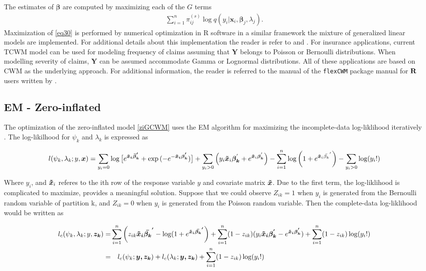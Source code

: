 \documentclass[11pt,letterpaper]{article}
\numberwithin{equation}{section}
\numberwithin{equation}{section}
\numberwithin{equation}{section}
\begin{document}
The estimates of $\bm\beta$ are computed by maximizing each of the $G$ terms
\begin{align}
\sum_{i=1}^{n}\pi^{(s)}_{ij} \log{q}(y_i|\bm x_i,\bm \beta_j,\lambda_j).
\label{eq30}
\end{align}
Maximization of \eqref{eq30} is performed by numerical optimization in R software in a similar framework the mixture of generalized linear models are implemented. For additional details about this implementation the reader is refer to \cite{Wedel+DeSabro:1995} and \cite{Wedel:2002}.
For insurance applications, current TCWM model can be used for modeling frequency of claims assuming that $\bm{Y}$ belongs to Poisson or Bernoulli distributions. When modelling severity of claims, $\bm{Y}$ can be assumed accommodate Gamma or Lognormal distributions. All of these applications are based on CWM as the underlying approach. For additional information, the reader is referred to the manual of the {\tt flexCWM} package manual for ${\bf R}$ users written by \cite{Ingrassia+Punzo+Vittadini+Minotti:2015}.%
\subsection{EM - Zero-inflated}
The optimization of the zero-inflated model \eqref{ziGCWM} uses the EM algorithm for maximizing the incomplete-data log-liklihood iteratively \citep{Lambert}. The log-likilhood for $\psi_k$ and $\lambda_k$ is expressed as 

\begin{align*}
l(\psi_k,\lambda_k; y, \bm{x}) = \sum_{y_i = 0} \log \big[ e^{ \bm{ \bm{\tilde{x}}_i \bar{\beta}_k^{'} } } + \exp{( - e^ { -\bm{ \bm{\tilde{x}}_i \beta_k^{'} }})} \big] + \sum_{y_i > 0 } \left( y_i \bm{\tilde{x}}_i \bm{\beta_k}^{'} + e^{ \bm{\tilde{x}}_i \bm{\beta_k}^{'} } \right) - \sum_{i=1}^n  \log \left(1 + e^ {\bm{\tilde{x}}_i \bar{\beta_k}^{'} } \right) - \sum_{y_i > 0} \log(y_i ! )
\end{align*}

Where $y_i$, and $\bm{\tilde{x}}_i$ referes to the ith row of the response variable $y$ and covariate matrix $\bm{\tilde{x}}$. Due to the first term, the log-liklihood is complicated to maximize, \cite{Lambert} provides a meaningful solution. Suppose that we could observe ${Z_{ik}} = 1$ when $y_i$ is generated from the Bernoulli random variable of partition k, and $Z_{ik} = 0$ when $y_i$ is generated from the Poisson random variable. Then the complete-data log-liklihood would be written as

\begin{align}
l_c(\psi_k,\lambda_k;y,\bm{z_k }) = & \sum_{i=1}^n \left( z_{ik}\bm{\bm{\tilde{x}}_i \bar{\beta_k }^{'}} - \log(1+ e^{\bm{ \bm{\tilde{x}}_i \bar{\beta_k }^{'}}} \right) + \sum_{i=1}^n (1-z_{ik}) (y_i \bm{ \bm{\tilde{x}}_i \beta_k^{'} } - e^{\bm{\bm{\tilde{x}}_i \beta_k^{'}}}) + \sum_{i=1}^n (1-z_{ik})\log(y_i!) \nonumber \\
=  & \quad l_c(\psi_k;\bm{y,z_k}) + l_c(\lambda_k; \bm{y,z_k}) + \sum_{i=1}^n (1- z_{ik})\log(y_i!) \label{CompleteZLog}
\end{align}
\end{document}
